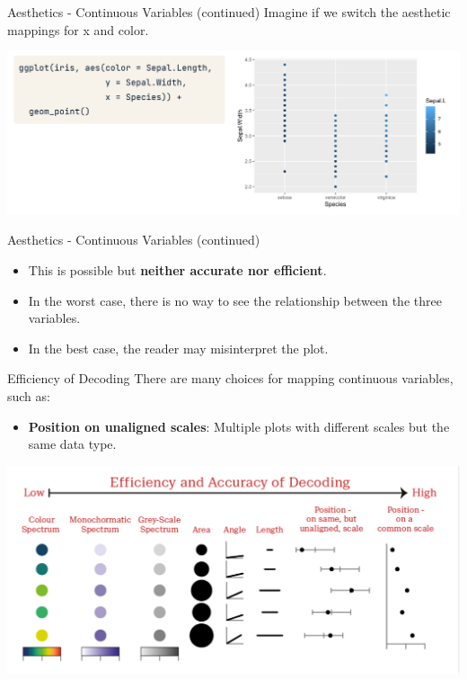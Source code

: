\documentclass[
  ignorenonframetext,
]{beamer}
\providecommand{\tightlist}{%
  \setlength{\itemsep}{0pt}\setlength{\parskip}{0pt}}
\begin{document}
\begin{frame}{Aesthetics - Continuous Variables (continued)}
\label{aesthetics---continuous-variables-continued}
Imagine if we switch the aesthetic mappings for x and color.

\includegraphics{../images/im175.png}
\end{frame}

\begin{frame}{Aesthetics - Continuous Variables (continued)}
\label{aesthetics---continuous-variables-continued-1}
\begin{itemize}
\tightlist
\item
  This is possible but \textbf{neither accurate nor efficient}.\\
\item
  In the worst case, there is no way to see the relationship between the
  three variables.
\item
  In the best case, the reader may misinterpret the plot.
\end{itemize}
\end{frame}

\begin{frame}{Efficiency of Decoding}
\label{efficiency-of-decoding}
There are many choices for mapping continuous variables, such as:

\begin{itemize}
\tightlist
\item
  \textbf{Position on unaligned scales}: Multiple plots with different
  scales but the same data type.
\end{itemize}

\includegraphics{../images/im176.png}
\end{frame}
\end{document}
